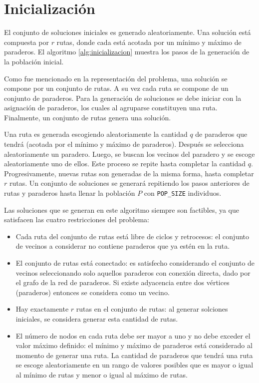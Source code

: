 \section{Inicialización}

El conjunto de soluciones iniciales es generado aleatoriamente. Una solución está compuesta por $r$ rutas, donde cada está acotada por un mínimo y máximo de paraderos. El algoritmo \ref{alg:inicializacion} muestra los pasos de la generación de la población inicial.

Como fue mencionado en la representación del problema, una solución se compone por un conjunto de rutas. A su vez cada ruta se compone de un conjunto de paraderos. Para la generación de soluciones se debe iniciar con la asignación de paraderos, los cuales al agruparse constituyen una ruta. Finalmente, un conjunto de rutas genera una solución. 

Una ruta es generada escogiendo aleatoriamente la cantidad $q$ de paraderos que tendrá (acotada por el mínimo y máximo de paraderos). Después se selecciona aleatoriamente un paradero. Luego, se buscan los vecinos del paradero y se escoge aleatoriamente uno de ellos. Este proceso se repite hasta completar la cantidad $q$. Progresivamente, nuevas rutas son generadas de la misma forma, hasta completar $r$ rutas. Un conjunto de soluciones se generará repitiendo los pasos anteriores de rutas y paraderos hasta llenar la población $P$ con \texttt{POP\_SIZE} individuos.

Las soluciones que se generan en este algoritmo siempre son factibles, ya que satisfacen las cuatro restricciones del problema:
\begin{itemize}
\item Cada ruta del conjunto de rutas está libre de ciclos y retrocesos: el conjunto de vecinos a considerar no contiene paraderos que ya estén en la ruta.
\item El conjunto de rutas está conectado: es satisfecho considerando el conjunto de vecinos seleccionando solo aquellos paraderos con conexión directa, dado por el grafo de la red de paraderos. Si existe adyacencia entre dos vértices (paraderos) entonces se considera como un vecino.
\item Hay exactamente $r$ rutas en el conjunto de rutas: al generar solciones iniciales, se considera generar esta cantidad de rutas.
\item El número de nodos en cada ruta debe ser mayor a uno y no debe exceder el valor máximo definido: el mínimo y máximo de paraderos está considerado al momento de generar una ruta. La cantidad de paraderos que tendrá una ruta se escoge aleatoriamente en un rango de valores posibles que es mayor o igual al mínimo de rutas y menor o igual al máximo de rutas.
\end{itemize} 

